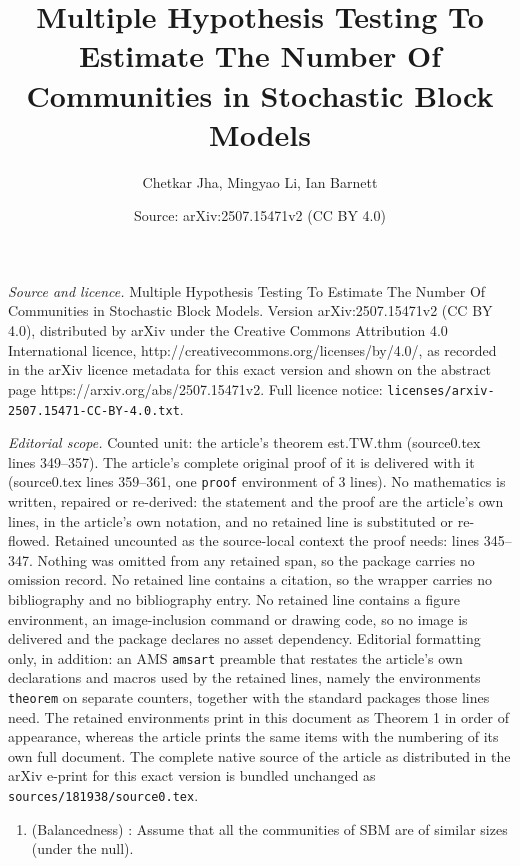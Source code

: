 \documentclass[10pt,a4paper]{amsart}
\title{Multiple Hypothesis Testing To Estimate The Number Of Communities in Stochastic Block Models}
\author{Chetkar Jha, Mingyao Li, Ian Barnett}
\date{Source: arXiv:2507.15471v2 (CC BY 4.0)}
\begin{document}
\maketitle

\noindent\emph{Source and licence.} Multiple Hypothesis Testing To Estimate The Number Of Communities in Stochastic Block Models. Version arXiv:2507.15471v2 (CC BY 4.0), distributed by arXiv under the Creative Commons Attribution 4.0 International licence, http://creativecommons.org/licenses/by/4.0/, as recorded in the arXiv licence metadata for this exact version and shown on the abstract page https://arxiv.org/abs/2507.15471v2. Full licence notice: \texttt{licenses/arxiv-2507.15471-CC-BY-4.0.txt}.\par\smallskip

\noindent\textit{Editorial scope.} Counted unit: the article's theorem est.TW.thm (source0.tex lines 349--357). The article's complete original proof of it is delivered with it (source0.tex lines 359--361, one \texttt{proof} environment of 3 lines). No mathematics is written, repaired or re-derived: the statement and the proof are the article's own lines, in the article's own notation, and no retained line is substituted or re-flowed.  Retained uncounted as the source-local context the proof needs: lines 345--347.  Nothing was omitted from any retained span, so the package carries no omission record.  No retained line contains a citation, so the wrapper carries no bibliography and no bibliography entry.  No retained line contains a figure environment, an image-inclusion command or drawing code, so no image is delivered and the package declares no asset dependency.  Editorial formatting only, in addition: an AMS \texttt{amsart} preamble that restates the article's own declarations and macros used by the retained lines, namely the environments \texttt{theorem} on separate counters, together with the standard packages those lines need.  The retained environments print in this document as Theorem 1 in order of appearance, whereas the article prints the same items with the numbering of its own full document.  The complete native source of the article as distributed in the arXiv e-print for this exact version is bundled unchanged as \texttt{sources/181938/source0.tex}.
\begin{enumerate}[ label =A\arabic*]
\item\label{A1} (Balancedness) : Assume that all the communities of SBM are of similar sizes (under the null). 
\end{enumerate}
\end{document}
